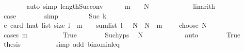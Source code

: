 \begin{isabellebody}
\ \ \ \ \ \ \isamarkupfalse%
\ {\isacharparenleft}{\kern0pt}auto\ simp{\isacharcolon}{\kern0pt}\ length{\isacharunderscore}{\kern0pt}Suc{\isacharunderscore}{\kern0pt}conv{\isacharparenright}{\kern0pt}\isanewline
\ \ \ \ \isamarkupfalse%
\ {\isachardoublequoteopen}m\ {\isacharequal}{\kern0pt}\ {}\ {\isasymand}\ N\ {\isacharequal}{\kern0pt}\ {}{\isachardoublequoteclose}\isanewline
\ \ \ \ \ \ \isamarkupfalse%
\ {}\ \isamarkupfalse%
\ linarith\isanewline
\ \ \ \ \isamarkupfalse%
\ \isamarkupfalse%
\ {\isacharquery}{\kern0pt}case\isanewline
\ \ \ \ \ \ \isamarkupfalse%
\ simp\isanewline
\ \ \isamarkupfalse%
\isanewline
\ \ \ \ \isamarkupfalse%
\ {\isacharparenleft}{\kern0pt}Suc\ k{\isacharparenright}{\kern0pt}\isanewline
\ \ \ \ \isamarkupfalse%
\ c{}{\isacharcolon}{\kern0pt}\ {\isachardoublequoteopen}card\ {\isacharbraceleft}{\kern0pt}l{\isacharcolon}{\kern0pt}{\isacharcolon}{\kern0pt}nat\ list{\isachardot}{\kern0pt}\ size\ l\ {\isacharequal}{\kern0pt}\ {\isacharparenleft}{\kern0pt}m\ {\isacharminus}{\kern0pt}\ {}{\isacharparenright}{\kern0pt}\ {\isasymand}\ sum{\isacharunderscore}{\kern0pt}list\ l\ {\isacharequal}{\kern0pt}\ \ N{\isacharbraceright}{\kern0pt}\ {\isacharequal}{\kern0pt}\ {\isacharparenleft}{\kern0pt}N\ {\isacharplus}{\kern0pt}\ {\isacharparenleft}{\kern0pt}m\ {\isacharminus}{\kern0pt}\ {}{\isacharparenright}{\kern0pt}\ {\isacharminus}{\kern0pt}\ {}{\isacharparenright}{\kern0pt}\ choose\ N{\isachardoublequoteclose}\isanewline
\ \ \ \ \isamarkupfalse%
\ {\isacharparenleft}{\kern0pt}cases\ {\isachardoublequoteopen}m\ {\isacharequal}{\kern0pt}\ {}{\isachardoublequoteclose}{\isacharparenright}{\kern0pt}\isanewline
\ \ \ \ \ \ \isamarkupfalse%
\ True\isanewline
\ \ \ \ \ \ \isamarkupfalse%
\ Suc{\isachardot}{\kern0pt}hyps\ \isamarkupfalse%
\ {\isachardoublequoteopen}N\ {\isasymge}\ {}{\isachardoublequoteclose}\isanewline
\ \ \ \ \ \ \ \ \isamarkupfalse%
\ auto\isanewline
\ \ \ \ \ \ \isamarkupfalse%
\ True\ \isamarkupfalse%
\ {\isacharquery}{\kern0pt}thesis\isanewline
\ \ \ \ \ \ \ \ \isamarkupfalse%
\ {\isacharparenleft}{\kern0pt}simp\ add{\isacharcolon}{\kern0pt}\ binomial{\isacharunderscore}{\kern0pt}eq{\isacharunderscore}{\kern0pt}{}{\isacharparenright}{\kern0pt}\isanewline

\end{isabellebody}
